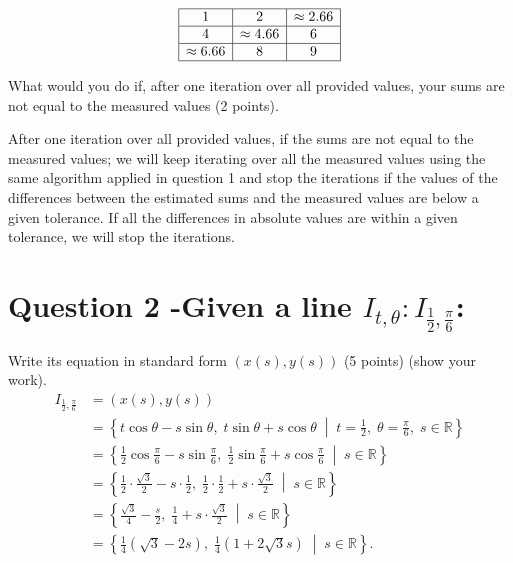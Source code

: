 \documentclass[12pt,twoside]{article}
\begin{document}
\[
\begin{array}{|c|c|c|}
\hline
1 & 2 &  \approx 2 .66\\
\hline
4 & \approx 4.66 & 6 \\
\hline
\approx 6.66 & 8 & 9 \\
\hline
\end{array}
\]
 \item What would you do if, after one iteration over all provided values, your sums are not equal to the measured values (2 points).
 
 After one iteration over all provided values, if the sums are not equal to the measured values; we will keep iterating over all the measured values
 using the same algorithm applied in question 1  and  stop the iterations if the values of the differences between the estimated sums and the measured values are below a given tolerance.
 If all the differences in absolute values are within a given tolerance, we will stop the iterations.
 
 \ee

 \section*{Question 2 -Given a line \( I_{t, \theta} : I_{\frac{1}{2}, \frac{\pi}{6}} \):}   
    \be
        \item Write its equation in standard form \( (x(s), y(s)) \) (5 points) (show your work).
        \begin{align*}
   		 I_{\frac{1}{2}, \frac{\pi}{6}} &= (x(s), y(s)) \\
    		&= \left\{ t \cos{\theta} - s \sin{\theta}, \; t \sin{\theta} + s \cos{\theta} \; \middle| \; t = \frac{1}{2}, \; \theta = \frac{\pi}{6}, \; s \in \mathbb{R} \right\} \\
	        &= \left\{ \frac{1}{2} \cos{\frac{\pi}{6}} - s \sin{\frac{\pi}{6}}, \; \frac{1}{2} \sin{\frac{\pi}{6}} + s \cos{\frac{\pi}{6}} \; \middle| \; s \in \mathbb{R} \right\} \\
    		&= \left\{ \frac{1}{2} \cdot \frac{\sqrt{3}}{2} - s \cdot \frac{1}{2}, \; \frac{1}{2} \cdot \frac{1}{2} + s \cdot \frac{\sqrt{3}}{2} \; \middle| \; s \in \mathbb{R} \right\} \\
    		&= \left\{ \frac{\sqrt{3}}{4} - \frac{s}{2}, \; \frac{1}{4} + s \cdot \frac{\sqrt{3}}{2} \; \middle| \; s \in \mathbb{R} \right\} \\
    		&= \left\{ \frac{1}{4} \left(\sqrt{3} - 2s\right), \; \frac{1}{4} \left(1 + 2\sqrt{3}s\right) \; \middle| \; s \in \mathbb{R} \right\}.
	\end{align*}
	
\end{document}
